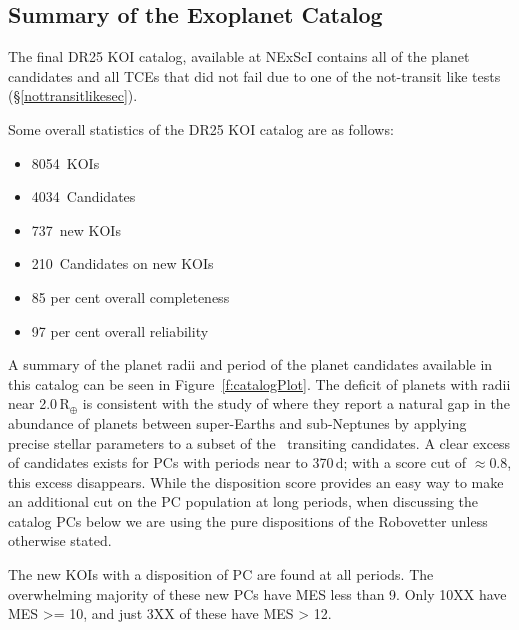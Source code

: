 \subsection{Summary of the Exoplanet Catalog}

The final DR25 KOI catalog, available at NExScI contains all of the planet candidates and all TCEs that did not fail due to one of the not-transit like tests (\S\ref{nottransitlikesec}). 


Some overall statistics of the DR25 KOI catalog are as follows:
\begin{itemize}
    \item 8054~KOIs
    \item 4034~Candidates
    \item 737~new KOIs
    \item 210~Candidates on new KOIs
    \item 85 per cent overall completeness
    \item 97 per cent overall reliability
\end{itemize}

A summary of the planet radii and period of the planet candidates available in this catalog can be seen in Figure~\ref{f:catalogPlot}. The deficit of planets with radii near 2.0\,R$_{\oplus}$ is consistent with the study of \citet{Fulton2017} where they report a natural gap in the abundance of planets between super-Earths and sub-Neptunes by applying precise stellar parameters to a subset of the \kepler\ transiting candidates. A clear excess of candidates exists for PCs with periods near to 370\,d;  with a score cut of $\approx0.8$, this excess disappears. While the disposition score provides an easy way to make an additional cut on the PC population at long periods, when discussing the catalog PCs below we are using the pure dispositions of the Robovetter unless otherwise stated. 

The new KOIs with a disposition of PC are found at all periods. The overwhelming majority of these new PCs have MES less than 9.  Only 10XX have MES >= 10, and just 3XX of these have MES > 12. 

